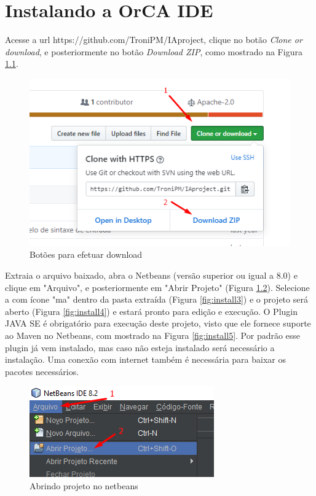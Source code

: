 \documentclass{bcc}
\begin{document}
\appendix
\chapter{Instalando a OrCA IDE}
\label{chap:apInstalacao}
Acesse a url https://github.com/TroniPM/IAproject, clique no botão \textit{Clone or download}, e posteriormente no botão \textit{Download ZIP}, como mostrado na Figura \ref{fig:install1}.

\begin{figure}[H]
\centering
\includegraphics[width=.7\textwidth]{Figuras/install1.png}
\caption{Botões para efetuar download} 
\label{fig:install1}
\end{figure}

Extraia o arquivo baixado, abra o Netbeans (versão superior ou igual a 8.0) e clique em "Arquivo", e posteriormente em "Abrir Projeto" (Figura \ref{fig:install2}). Selecione a com ícone "ma" dentro da pasta extraída (Figura \ref{fig:install3}) e o projeto será aberto (Figura \ref{fig:install4}) e estará pronto para edição e execução. O Plugin JAVA SE é obrigatório para execução deste projeto, visto que ele fornece suporte ao Maven no Netbeans, com mostrado na Figura \ref{fig:install5}. Por padrão esse plugin já vem instalado, mas caso não esteja instalado será necessário a instalação. Uma conexão com internet também é necessária para baixar os pacotes necessários.

\begin{figure}[H]
\centering
\includegraphics[width=.7\textwidth]{Figuras/install2.png}
\caption{Abrindo projeto no netbeans} 
\label{fig:install2}
\end{figure}
\end{document}
